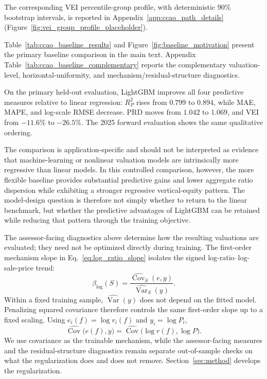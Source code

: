 \documentclass[10pt]{article}
\theoremstyle{definition}
\newcommand{\1}{\mathbf{1}}
\begin{document}
The corresponding VEI percentile-group profile, with deterministic 90\% bootstrap intervals, is reported in Appendix~\ref{app:ccao_path_details} (Figure~\ref{fig:vei_group_profile_placeholder}).


Table~\ref{tab:ccao_baseline_results} and Figure~\ref{fig:baseline_motivation} present the primary baseline comparison in the main text. Appendix Table~\ref{tab:ccao_baseline_complementary} reports the complementary valuation-level, horizontal-uniformity, and mechanism/residual-structure diagnostics.

{On the primary held-out evaluation, LightGBM improves all four predictive measures relative to linear regression: $R^2_P$ rises from $0.799$ to $0.894$, while MAE, MAPE, and log-scale RMSE decrease. PRD moves from $1.042$ to $1.069$, and VEI from $-11.6\%$ to $-26.5\%$. The 2025 forward evaluation shows the same qualitative ordering.}


{The comparison is application-specific and should not be interpreted as evidence that machine-learning or nonlinear valuation models are intrinsically more regressive than linear models. In this controlled comparison, however, the more flexible baseline provides substantial predictive gains and lower aggregate ratio dispersion while exhibiting a stronger regressive vertical-equity pattern. The model-design question is therefore not simply whether to return to the linear benchmark, but whether the predictive advantages of LightGBM can be retained while reducing that pattern through the training objective.}


{The assessor-facing diagnostics above determine how the resulting valuations are evaluated; they need not be optimized directly during training. The first-order mechanism slope in Eq.~\eqref{eq:log_ratio_slope} isolates the signed log-ratio--log-sale-price trend:
\[
\beta_{\log}(S)
=
\frac{\widehat{\operatorname{Cov}}_S(e,y)}
{\widehat{\operatorname{Var}}_S(y)}.
\]
Within a fixed training sample, $\widehat{\operatorname{Var}}(y)$ does not depend on the fitted model. Penalizing squared covariance therefore controls the same first-order slope up to a fixed scaling. Using $e_i(f)=\log r_i(f)$ and $y_i=\log P_i$,
\begin{equation}
\label{eq:training_covariance_bridge}
\widehat{\operatorname{Cov}}\bigl(e(f),y\bigr)
=
\widehat{\operatorname{Cov}}\bigl(\log r(f),\log P\bigr).
\end{equation}
We use covariance as the trainable mechanism, while the assessor-facing measures and the residual-structure diagnostics remain separate out-of-sample checks on what the regularization does and does not remove. Section~\ref{sec:method} develops the regularization.}
\end{document}
